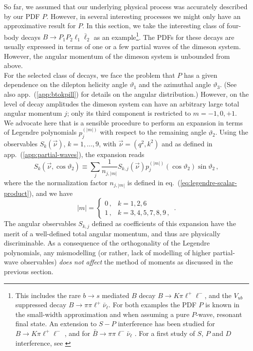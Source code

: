 \documentclass[aps,prd,reprint,nofootinbib,preprintnumbers]{revtex4}
\newcommand{\refapp}[1]{app.~(\ref{app:#1})}
\newcommand{\refeq}[1]{eq.~(\ref{eq:#1})}
\renewcommand{\theta}{\vartheta}
\begin{document}
So far, we assumed that our underlying physical process was accurately described by our PDF $P$.
However, in several interesting processes we might only have an approximative result for $P$.
In this section, we take the interesting class of four-body decays $B\to P_1 P_2 \ell_1 \bar\ell_2$
as an example\footnote{This includes the rare $b\to s$ mediated $B$ decay $B \to K\pi\ell^+\ell^-$, and
the $V_{ub}$ suppressed decay $B\to \pi\pi\ell^+\bar\nu_\ell$. For both examples the PDF $P$ is known in
the small-width approximation and when assuming a pure $P$-wave, resonant final state. An extension to
$S-P$ interference has been studied for $B\to K\pi\ell^+\ell^-$ \cite{Blake:2012mb,Becirevic:2011bp},
and for $\bar{B}\to \pi\pi\ell^-\bar\nu_\ell$ \cite{Faller:2013dwa}. For a first study of $S$, $P$
and $D$ interference, see \cite{Das:2014sra}}.%
The PDFs for these decays are usually expressed in terms of one or a few partial waves
of the dimeson system. However, the angular momentum of the dimeson system is unbounded from above.
\\

For the selected class of decays, we face the problem that $P$ has a given dependence on the dilepton
helicity angle $\theta_1$ and the azimuthal angle $\theta_3$. (See also \refapp{btokpill} for details
on the angular distribution.) However, on the level of decay amplitudes the dimeson system can have an arbitrary
large total angular momentum $j$; only its third component is restricted to $m = -1,0,+1$.\\

We advocate here that is a sensible procedure to perform an expansion in terms of Legendre polynomials $p_{j}^{(|m|)}$
with respect to the remaining angle $\theta_2$. Using the observables $S_k(\vec{\nu})$, $k=1,\dots,9$, with $\vec{\nu}=(q^2, k^2)$
and as defined in \refapp{partial-waves}, the expansion reads
\begin{equation}
    S_{k}(\vec{\nu},\cos\theta_2) \equiv \sum_{j} \frac{1}{n_{j,|m|}} S_{k,j}(\vec{\nu}) p_{j}^{(|m|)}(\cos\theta_2)\sin\theta_2\,,
\end{equation}
where the the normalization factor $n_{j,|m|}$ is defined in \refeq{legendre-scalar-product}, and we have
\begin{equation}
    |m| = \begin{cases}
        0\,, & k = 1,2,6\,\\
        1\,, & k = 3,4,5,7,8,9\,,
    \end{cases}\,.
\end{equation}
The angular observables $S_{k,j}$ defined as coefficients of this expansion
have the merit of a well-defined total angular momentum, and thus are physically discriminable.
As a consequence of the orthogonality of the Legendre polynomials, any mismodelling (or rather, lack of modelling of higher
partial-wave observables) \emph{does not affect} the method of moments as discussed in the previous section.\\
\end{document}
